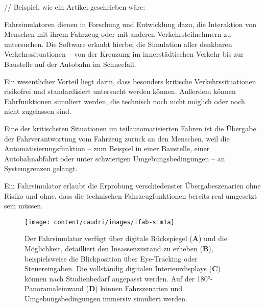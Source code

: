 // Beispiel, wie ein Artikel geschrieben wäre:
{\mediumfamily\color{white} Fahrsimulatoren dienen in Forschung und Entwicklung dazu, die Interaktion von Menschen mit ihrem Fahrzeug oder mit anderen Verkehrsteilnehmern zu untersuchen. Die Software erlaubt hierbei die Simulation aller denkbaren Verkehrssituationen -- von der Kreuzung im innerstädtischen Verkehr bis zur Baustelle auf der Autobahn im Schneefall. 

Ein wesentlicher Vorteil liegt darin, dass besonders kritische Verkehrssituationen risikofrei und standardisiert untersucht werden können. Außerdem können Fahrfunktionen simuliert werden, die technisch noch nicht möglich oder noch nicht zugelassen sind.


Eine der kritischsten Situationen im teilautomatisierten Fahren ist die Übergabe der Fahrverantwortung vom Fahrzeug zurück an den Menschen, weil die Automatisierungsfunktion -- zum Beispiel in einer Baustelle, einer Autobahnabfahrt oder unter schwierigen Umgebungsbedingungen -- an Systemgrenzen gelangt.

Ein Fahrsimulator erlaubt die Erprobung verschiedenster Übergabeszenarien ohne Risiko und ohne, dass die technischen Fahrzeugfunktionen bereits real umgesetzt sein müssen.}



\begin{figure*}[t]%
\begin{nomargin} %
\vspace{-\texttopoffset} %
\texttt{[image: content/caudri/images/ifab-sim1a]}%
\end{nomargin} %
\caption{Der Fahrsimulator verfügt über digitale Rückspiegel (\textbf{A}) und die Möglichkeit, detailliert den Insassenzustand zu erheben (\textbf{B}), beispielsweise die Blickposition über Eye-Tracking oder Steuereingaben. Die vollständig digitalen Interieurdisplays (\textbf{C}) können nach Studienbedarf angepasst werden. Auf der 180°-Panoramaleinwand (\textbf{D}) können Fahrszenarien und Umgebungsbedingungen immersiv simuliert werden.}%
%
\end{figure*}

